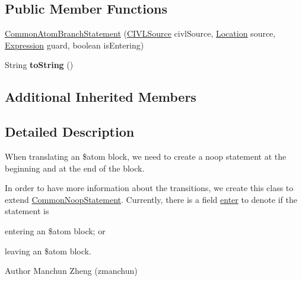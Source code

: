 \subsection*{Public Member Functions}
\begin{DoxyCompactItemize}
\item 
\hyperlink{classedu_1_1udel_1_1cis_1_1vsl_1_1civl_1_1model_1_1common_1_1statement_1_1CommonAtomBranchStatement_afbf71c3060f9d2d7c24e3b01a4bfad77}{Common\+Atom\+Branch\+Statement} (\hyperlink{interfaceedu_1_1udel_1_1cis_1_1vsl_1_1civl_1_1model_1_1IF_1_1CIVLSource}{C\+I\+V\+L\+Source} civl\+Source, \hyperlink{interfaceedu_1_1udel_1_1cis_1_1vsl_1_1civl_1_1model_1_1IF_1_1location_1_1Location}{Location} source, \hyperlink{interfaceedu_1_1udel_1_1cis_1_1vsl_1_1civl_1_1model_1_1IF_1_1expression_1_1Expression}{Expression} guard, boolean is\+Entering)
\item 
\hypertarget{classedu_1_1udel_1_1cis_1_1vsl_1_1civl_1_1model_1_1common_1_1statement_1_1CommonAtomBranchStatement_ab737442cfad69ec2c9a755f1e17babd9}{}String {\bfseries to\+String} ()\label{classedu_1_1udel_1_1cis_1_1vsl_1_1civl_1_1model_1_1common_1_1statement_1_1CommonAtomBranchStatement_ab737442cfad69ec2c9a755f1e17babd9}

\end{DoxyCompactItemize}
\subsection*{Additional Inherited Members}


\subsection{Detailed Description}
When translating an \$atom block, we need to create a noop statement at the beginning and at the end of the block. 

In order to have more information about the transitions, we create this class to extend \hyperlink{classedu_1_1udel_1_1cis_1_1vsl_1_1civl_1_1model_1_1common_1_1statement_1_1CommonNoopStatement}{Common\+Noop\+Statement}. Currently, there is a field \hyperlink{}{enter} to denote if the statement is 
\begin{DoxyEnumerate}
\item entering an \$atom block; or 
\item leaving an \$atom block. 
\end{DoxyEnumerate}

\begin{DoxyAuthor}{Author}
Manchun Zheng (zmanchun) 
\end{DoxyAuthor}


